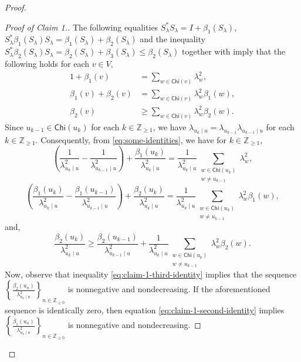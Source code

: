 \documentclass[11pt, reqno, a4paper]{amsart}
\theoremstyle{definition}
\renewcommand{\le}{\leqslant}
\renewcommand{\ge}{\geqslant}
\newcommand{\Z}{\mathbb Z}
\newcommand{\Chi}{\mathsf{Chi}}
\numberwithin{equation}{section}
\begin{document}
\begin{proof}
    \begin{proof}[Proof of Claim 1.] The following equalities $S_{\lambda}^* S_{\lambda} =I+\beta_{1}(S_\lambda)$,  $S_{\lambda}^*\beta_1(S_{\lambda})S_{\lambda} = \beta_{1}(S_{\lambda})+\beta_{2}(S_{\lambda})$ and the inequality $S_{\lambda}^*\beta_{2}(S_{\lambda})S_{\lambda} = \beta_{2}(S_{\lambda})+\beta_{3}(S_{\lambda}) \le \beta_{2}(S_{\lambda})$
    together with  imply that the following holds for each $v \in  V$,
    \begin{equation}
        \begin{aligned}
         1 +\beta_1 (v) &= \sum_{w \in \Chi (v)} \lambda_w^{2}, \\
        \beta_1(v) + \beta_2 (v) &= \sum_{w \in \Chi (v)} \lambda_w ^{2} \beta_1 (w),  \\
        \beta_2 (v) & \ge \sum_{w\in \Chi (v) } \lambda_w ^{2} \beta_2 (w).
        \end{aligned}
        \label{eq:some-identities}
    \end{equation}
   Since $u_{k-1} \in \Chi (u_k)$ for each $k \in \Z_{\ge 1}$, we have $\lambda_{u_k \mid u} = \lambda_{u_{k-1}} \lambda_{u_{k-1} \mid u}$ for each $k \in \Z_{\ge 1}$. Consequently, from \eqref{eq:some-identities}, we have for $k \in \Z_{\ge 1}$,
    \begin{equation}
        \left( \frac{1}{\lambda_{u_k \mid u}^{2}} - \frac{1}{\lambda_{u_{k-1} \mid u} ^{2}} \right) + \frac{\beta_1 (u_k)}{\lambda_{u_k \mid u}^{2}} = \frac{1}{\lambda_{u_k \mid u} ^{2}} \sum_{\substack{w \in \Chi (u_k) \\ w \ne u_{k-1}}} \lambda_w ^{2},
        \label{eq:claim-1-first-identity}
    \end{equation}
    \begin{equation}
        \left( \frac{\beta_1(u_k)} {\lambda_{u_k \mid u}^2} - \frac{\beta_1(u_{k-1})} {\lambda_{u_{k-1}\mid u}^2} \right) + \frac{\beta_2(u_k)} {\lambda_{u_k \mid u}^2} = \frac{1}{\lambda_{u_k\mid u}^2} \sum_{\substack{w \in \Chi (u_k) \\ w \ne u_{k-1}}} \lambda_w^2\beta_1(w),
        \label{eq:claim-1-second-identity}
    \end{equation}
    and, 
    \begin{equation}
        \frac{\beta_2(u_k)}{\lambda_{u_k\mid u}^2} \ge \frac{\beta_2(u_{k-1})} {\lambda_{u_{k-1}\mid u}^2} + \frac{1}{\lambda_{u_k\mid u}^2} \sum_{\substack{w \in \Chi (u_k) \\ w \ne u_{k-1}}} \lambda_w^2\beta_2(w).
        \label{eq:claim-1-third-identity}
    \end{equation}
    Now, observe that inequality \eqref{eq:claim-1-third-identity} implies that the sequence $\left \{ \frac{\beta_2 (u_n)}{\lambda_{u_n \mid u}^2} \right\} _{n \in \Z_{\ge 0}}$ is nonnegative and nondecreasing. If the aforementioned sequence is identically zero, then equation \eqref{eq:claim-1-second-identity} implies $\left \{ \frac{\beta_1 (u_n)}{\lambda_{u_n \mid u}^2} \right\} _{n \in \Z_{\ge 0}}$ is nonnegative and nondecreasing.


\end{proof}
\end{proof}
\end{document}
